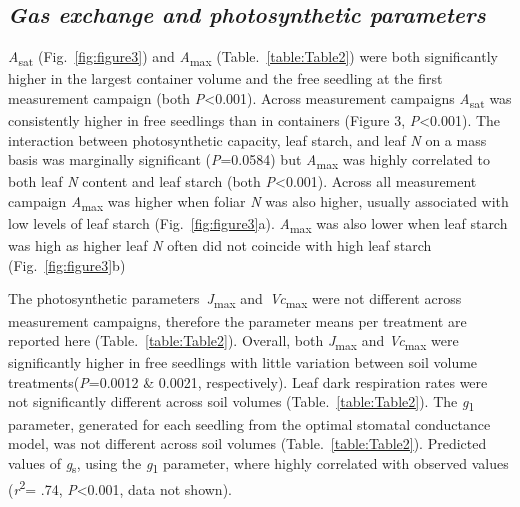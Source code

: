 \documentclass[a4paper]{article}\usepackage[]{graphicx}\usepackage[]{color}
\begin{document}
\subsection*{\textit{Gas exchange and photosynthetic parameters}}
\textit{A}\textsubscript{sat} (Fig.~\ref{fig:figure3}) and \textit{A}\textsubscript{max} (Table.~\ref{table:Table2}) were both significantly higher in the largest container volume and the free seedling at the first measurement campaign (both \textit{P}\textless0.001). Across measurement campaigns \textit{A}\textsubscript{sat} was consistently higher in free seedlings than in containers (Figure 3, \textit{P}\textless0.001). The interaction between photosynthetic capacity, leaf starch, and leaf \textit{N} on a mass basis was marginally significant (\textit{P}=0.0584) but \textit{A}\textsubscript{max} was highly correlated to both leaf \textit{N} content and leaf starch (both \textit{P}\textless0.001). Across all measurement campaign \textit{A}\textsubscript{max} was higher when foliar \textit{N} was also higher, usually associated with low levels of leaf starch (Fig.~\ref{fig:figure3}a). \textit{A}\textsubscript{max} was also lower when leaf starch was high as higher leaf \textit{N} often did not coincide with high leaf starch (Fig.~\ref{fig:figure3}b)

The photosynthetic parameters~\textit{J}\textsubscript{max} and~\textit{Vc}\textsubscript{max} were not different across measurement campaigns, therefore the parameter means per treatment are reported here (Table.~\ref{table:Table2}).  Overall, both \textit{J}\textsubscript{max} and \textit{Vc}\textsubscript{max} were significantly higher in free seedlings with little variation between soil volume treatments(\textit{P}=0.0012 \& 0.0021, respectively). Leaf dark respiration rates were not significantly different across soil volumes (Table.~\ref{table:Table2}). The \textit{g}\textsubscript{1} parameter, generated for each seedling from the \citet{medlyn2012reconciling} optimal stomatal conductance model, was not different across soil volumes (Table.~\ref{table:Table2}). Predicted values of \textit{g}\textsubscript{s}, using the \textit{g}\textsubscript{1} parameter, where highly correlated with observed values (\textit{r}\textsuperscript{2}= .74, \textit{P}\textless0.001, data not shown).
\end{document}
